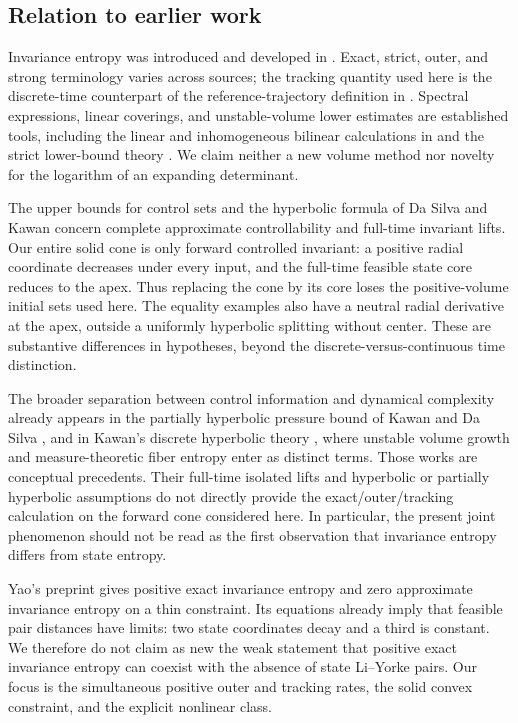 \documentclass[11pt,a4paper]{article}
\theoremstyle{definition}
\theoremstyle{remark}
\begin{document}
\subsection{Relation to earlier work}

Invariance entropy was introduced and developed in \cite{CK2009,K2009,K2011}. Exact, strict, outer, and strong terminology varies across sources; the tracking quantity used here is the discrete-time counterpart of the reference-trajectory definition in \cite[Definition 3.1.1]{K2009}. Spectral expressions, linear coverings, and unstable-volume lower estimates are established tools, including the linear and inhomogeneous bilinear calculations in \cite[Theorem 4.1.2, Proposition 4.1.9, and Theorem 4.1.10]{K2009} and the strict lower-bound theory \cite{KStrict2011}. We claim neither a new volume method nor novelty for the logarithm of an expanding determinant.

The upper bounds for control sets and the hyperbolic formula of Da Silva and Kawan \cite{DSK2016} concern complete approximate controllability and full-time invariant lifts. Our entire solid cone is only forward controlled invariant: a positive radial coordinate decreases under every input, and the full-time feasible state core reduces to the apex. Thus replacing the cone by its core loses the positive-volume initial sets used here. The equality examples also have a neutral radial derivative at the apex, outside a uniformly hyperbolic splitting without center. These are substantive differences in hypotheses, beyond the discrete-versus-continuous time distinction.

The broader separation between control information and dynamical complexity already appears in the partially hyperbolic pressure bound of Kawan and Da Silva \cite{KDS2018}, and in Kawan's discrete hyperbolic theory \cite{KChaos}, where unstable volume growth and measure-theoretic fiber entropy enter as distinct terms. Those works are conceptual precedents. Their full-time isolated lifts and hyperbolic or partially hyperbolic assumptions do not directly provide the exact/outer/tracking calculation on the forward cone considered here. In particular, the present joint phenomenon should not be read as the first observation that invariance entropy differs from state entropy.

Yao's preprint \cite[Theorem 3.1]{Yao2026} gives positive exact invariance entropy and zero approximate invariance entropy on a thin constraint. Its equations already imply that feasible pair distances have limits: two state coordinates decay and a third is constant. We therefore do not claim as new the weak statement that positive exact invariance entropy can coexist with the absence of state Li--Yorke pairs. Our focus is the simultaneous positive outer and tracking rates, the solid convex constraint, and the explicit nonlinear class.
\end{document}

